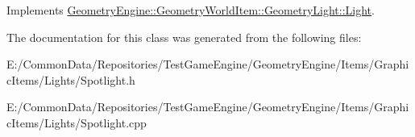 Implements \mbox{\hyperlink{class_geometry_engine_1_1_geometry_world_item_1_1_geometry_light_1_1_light_a108d5b6143e4c55113f7656224f9799f}{Geometry\+Engine\+::\+Geometry\+World\+Item\+::\+Geometry\+Light\+::\+Light}}.



The documentation for this class was generated from the following files\+:\begin{DoxyCompactItemize}
\item 
E\+:/\+Common\+Data/\+Repositories/\+Test\+Game\+Engine/\+Geometry\+Engine/\+Items/\+Graphic\+Items/\+Lights/Spotlight.\+h\item 
E\+:/\+Common\+Data/\+Repositories/\+Test\+Game\+Engine/\+Geometry\+Engine/\+Items/\+Graphic\+Items/\+Lights/Spotlight.\+cpp\end{DoxyCompactItemize}
